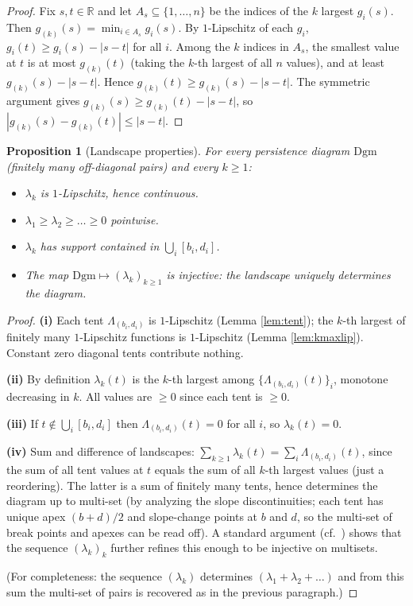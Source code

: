 \documentclass[11pt]{article}
\theoremstyle{persdef}
\newtheorem{proposition}[definition]{Proposition}
\newcommand{\R}{\mathbb{R}}
\newcommand{\PD}{\mathrm{Dgm}}
\newcommand{\Land}{\lambda}
\begin{document}
\begin{proof}
Fix $s,t\in\R$ and let $A_s\subseteq\{1,\dots,n\}$ be the indices of the $k$ largest $g_i(s)$. Then $g_{(k)}(s) = \min_{i\in A_s} g_i(s)$. By $1$-Lipschitz of each $g_i$, $g_i(t)\geq g_i(s)-|s-t|$ for all $i$. Among the $k$ indices in $A_s$, the smallest value at $t$ is at most $g_{(k)}(t)$ (taking the $k$-th largest of all $n$ values), and at least $g_{(k)}(s)-|s-t|$. Hence $g_{(k)}(t)\geq g_{(k)}(s) - |s-t|$. The symmetric argument gives $g_{(k)}(s)\geq g_{(k)}(t)-|s-t|$, so $|g_{(k)}(s)-g_{(k)}(t)|\leq|s-t|$.
\end{proof}

\begin{proposition}[Landscape properties]\label{prop:landprops}
For every persistence diagram $\PD$ (finitely many off-diagonal pairs) and every $k\geq 1$:
\begin{itemize}[leftmargin=2em,itemsep=0.2em]
  \item[\textup{(i)}] $\Land_k$ is $1$-Lipschitz, hence continuous.
  \item[\textup{(ii)}] $\Land_1\geq\Land_2\geq\dots\geq 0$ pointwise.
  \item[\textup{(iii)}] $\Land_k$ has support contained in $\bigcup_i [b_i,d_i]$.
  \item[\textup{(iv)}] The map $\PD\mapsto(\Land_k)_{k\geq 1}$ is injective: the landscape uniquely determines the diagram.
\end{itemize}
\end{proposition}

\begin{proof}
\textbf{(i)} Each tent $\Lambda_{(b_i,d_i)}$ is $1$-Lipschitz (Lemma \ref{lem:tent}); the $k$-th largest of finitely many $1$-Lipschitz functions is $1$-Lipschitz (Lemma \ref{lem:kmaxlip}). Constant zero diagonal tents contribute nothing.

\textbf{(ii)} By definition $\Land_k(t)$ is the $k$-th largest among $\{\Lambda_{(b_i,d_i)}(t)\}_i$, monotone decreasing in $k$. All values are $\geq 0$ since each tent is $\geq 0$.

\textbf{(iii)} If $t\notin\bigcup_i[b_i,d_i]$ then $\Lambda_{(b_i,d_i)}(t)=0$ for all $i$, so $\Land_k(t)=0$.

\textbf{(iv)} Sum and difference of landscapes: $\sum_{k\geq 1}\Land_k(t) = \sum_i\Lambda_{(b_i,d_i)}(t)$, since the sum of all tent values at $t$ equals the sum of all $k$-th largest values (just a reordering). The latter is a sum of finitely many tents, hence determines the diagram up to multi-set (by analyzing the slope discontinuities; each tent has unique apex $(b+d)/2$ and slope-change points at $b$ and $d$, so the multi-set of break points and apexes can be read off). A standard argument (cf.\ \cite[Thm.~12]{Bub15}) shows that the sequence $(\Land_k)_k$ further refines this enough to be injective on multisets.

(For completeness: the sequence $(\Land_k)$ determines $(\Land_1+\Land_2+\dots)$ and from this sum the multi-set of pairs is recovered as in the previous paragraph.)
\end{proof}
\end{document}
